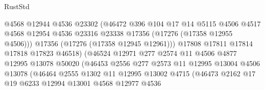 \begin{lexlean}{RustStd}
\begin{coremodule}
                                  @4568
                                  @12944
                                  @4536
                                  @23302
                                  (@46472
                                    @396
                                    @104
                                    @17
                                    @14
                                    @5115
                                    @4506
                                    @4517
                                    @4568
                                    @12954
                                    @4536
                                    @23316
                                    @23338
                                    @17356
                                    (@17276 (@17358 @12955 @4506)))
                                  @17356
                                  (@17276 (@17358 @12945 @12961)))
                                @17808
                                @17811
                                @17814
                                @17818
                                @17823
                                @46518)
                              (@46524
                                @12971
                                @277
                                @2574
                                @11
                                @4506
                                @4877
                                @12995
                                @13078
                                @50020
                                (@46453
                                  @2556
                                  @277
                                  @2573
                                  @11
                                  @12995
                                  @13004
                                  @4506
                                  @13078
                                  (@46464
                                    @2555
                                    @1302
                                    @11
                                    @12995
                                    @13002
                                    @4715
                                    (@46473
                                      @2162
                                      @17
                                      @19
                                      @6233
                                      @12994
                                      @13001
                                      @4568
                                      @12977
                                      @4536

\end{coremodule}
\end{lexlean}
